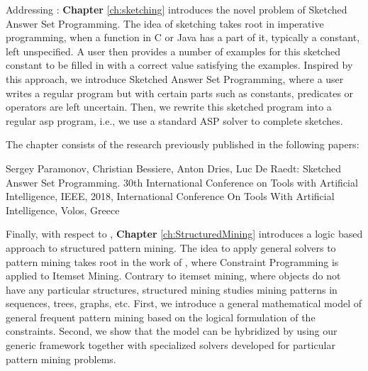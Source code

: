 Addressing \cthree:  \textbf{Chapter} \ref{ch:sketching} introduces the novel problem of
Sketched Answer Set Programming. The idea of sketching takes root in
imperative programming, when a function in C or Java has a part of it,
typically a constant, left unspecified. A user then provides a number
of examples for this sketched constant to be filled in with a
correct value satisfying the examples. Inspired by this approach, we
introduce Sketched Answer Set Programming, where a user writes a
regular program but with certain parts such as constants, predicates
or operators are left uncertain. Then, we rewrite this sketched
program into a regular \acrlong{asp} program, i.e., we use a standard ASP solver
to complete sketches.


The chapter consists of the research previously published in the following papers:
\pubrev
\begin{addmargin}[2em]{2em}
  Sergey Paramonov, Christian Bessiere, Anton Dries, Luc De Raedt:
  Sketched Answer Set Programming. 30th International Conference on Tools with Artificial Intelligence, IEEE, 2018, International Conference On Tools With Artificial Intelligence, Volos, Greece 
\end{addmargin}
\pubrevend





Finally, with respect to \cfour, \textbf{Chapter} \ref{ch:StructuredMining} introduces a logic
based approach to structured pattern mining. The idea to apply general
solvers to pattern mining takes root in the work of
\textcite{declrativeapproach}, where Constraint Programming is applied to
Itemset Mining. Contrary to itemset mining, where objects do not have
any particular structures, structured mining studies mining patterns
in sequences, trees, graphs, etc. First, we introduce a general
mathematical model of general frequent pattern mining based on the logical formulation of
the constraints. Second, we show that the model can be hybridized by
using our generic framework together with specialized solvers
developed for particular pattern mining problems.

